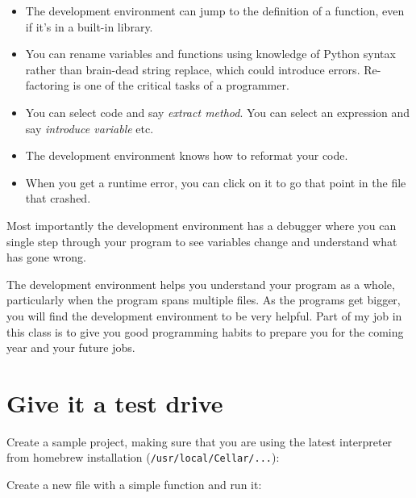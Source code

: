 \begin{fullwidth}
\begin{itemize}
\item The development environment can jump to the definition of a function, even if it's in a built-in library.
\item  You can rename variables and functions using knowledge of Python syntax rather than brain-dead string replace, which could introduce errors. Re-factoring is one of the critical tasks of a programmer.
\item  You can select code and say {\em extract method}. You can select an expression and say {\em introduce variable} etc. 
\item  The development environment knows how to reformat your code. 
\item  When you get a runtime error, you can click on it to go that point in the file that crashed.
\end{itemize}

Most importantly the development environment has a debugger where you can single step through your program to see variables change and understand what has gone wrong.

The development environment helps you understand your program as a whole, particularly when the program spans multiple files. As the programs get bigger, you will find the development environment to be very helpful. Part of my job in this class is to give you good programming habits to prepare you for the coming year and your future jobs.

\section{Give it a test drive}

\noindent Create a sample project, making sure that you are using the latest interpreter from homebrew installation ({\tt /usr/local/Cellar/...}):


\noindent Create a new file with a simple function and run it:


\end{fullwidth}
